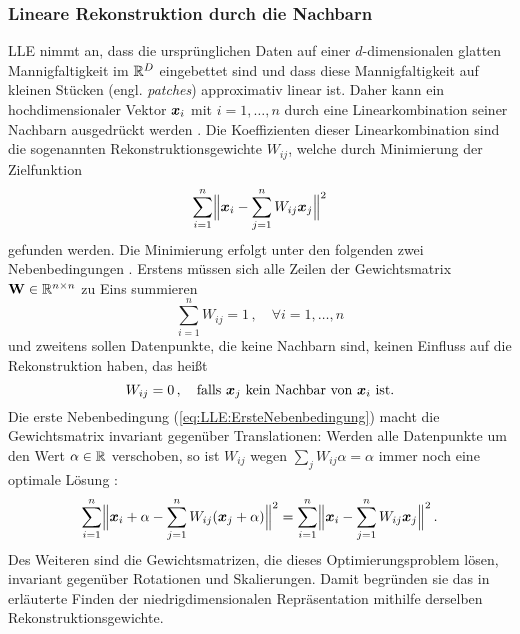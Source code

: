 \subsubsection{Lineare Rekonstruktion durch die Nachbarn}
\label{ch:MethodenDerDimRed:statistisch:LLE:LineareRekonstruktion}
LLE nimmt an, dass die ursprünglichen Daten auf einer $d$-dimensionalen glatten Mannigfaltigkeit im $\real^D$ eingebettet sind und dass diese Mannigfaltigkeit auf kleinen Stücken (engl. \textit{patches}) approximativ linear ist. Daher kann ein hochdimensionaler Vektor $\vect{x}_i$ mit $i = 1,\ldots,n$ durch eine Linearkombination seiner Nachbarn
ausgedrückt werden \parencite[2323]{Roweis.2000}. Die Koeffizienten dieser Linearkombination sind die sogenannten
Rekonstruktionsgewichte $W_{ij}$, welche durch Minimierung der Zielfunktion
\begin{equation}
	\label{eq:LLE:Zielfunktion}
	\sum_{i = 1}^n \norm[\Big]{ \vect{x}_i - \sum_{j = 1}^n W_{ij}\vect{x}_j}^2
\end{equation}
gefunden werden. Die Minimierung erfolgt unter den folgenden zwei Nebenbedingungen \parencite[2]{Roweis.2000}. Erstens müssen sich alle Zeilen der Gewichtsmatrix $\mat{W} \in \real^{n
		\times n}$ zu Eins summieren
\begin{equation}
	\label{eq:LLE:ErsteNebenbedingung}
	\sum_{i = 1}^nW_{ij} = 1 \, , \quad \forall i = 1, \ldots, n
\end{equation}
und zweitens sollen Datenpunkte, die keine Nachbarn sind, keinen Einfluss auf die Rekonstruktion haben, das heißt
\begin{equation}
	\label{eq:LLE:ZweiteNebenbedingung}
	W_{ij} = 0 \, , \quad \text{falls } \vect{x}_j \text{ kein Nachbar von } \vect{x}_i \text{ ist.}
\end{equation}
Die erste Nebenbedingung (\eqref{eq:LLE:ErsteNebenbedingung}) macht die Gewichtsmatrix invariant gegenüber Translationen: Werden alle Datenpunkte um den Wert $\alpha \in \real$ verschoben, so ist $W_{ij}$ wegen $\sum_j W_{ij}\alpha = \alpha$ immer noch eine optimale Lösung \parencite[8]{Cayton.2005}:
\begin{equation}
	\sum_{i = 1}^n \norm[\Big]{ \vect{x}_i + \alpha - \sum_{j = 1}^n W_{ij}(\vect{x}_j + \alpha)}^2 = \sum_{i = 1}^n \norm[\Big]{ \vect{x}_i - \sum_{j = 1}^n W_{ij}\vect{x}_j}^2 \, .
\end{equation}
Des Weiteren sind die Gewichtsmatrizen, die dieses Optimierungsproblem lösen, invariant gegenüber Rotationen und Skalierungen. Damit begründen sie das in  erläuterte Finden der niedrigdimensionalen Repräsentation mithilfe derselben Rekonstruktionsgewichte.

